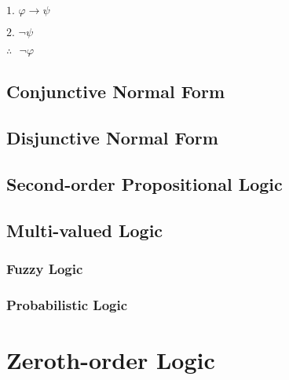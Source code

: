 $\textrm{1. }\varphi \rightarrow \psi$

$\textrm{2. }\neg\psi$

$\therefore\textrm{ }\neg\varphi$\\



\subsection{Conjunctive Normal Form}\label{sec:conjunctive_form}

\subsection{Disjunctive Normal Form}\label{sec:disjunctive_form}

\subsection{Second-order Propositional Logic}
\label{sec:secondorder_propositional_logic}

\subsection{Multi-valued Logic}\label{sec:multi_valued_logic}

\subsubsection{Fuzzy Logic}\label{sec:fuzzy_logic}

\subsubsection{Probabilistic Logic}\label{sec:probabilistic_logic}



\section{Zeroth-order Logic}\label{sec:zerothorder_logic}

